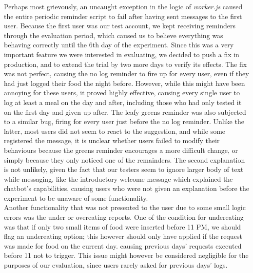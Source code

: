 Perhaps most grievously, an uncaught exception in the logic of \textit{worker.js} caused the entire periodic reminder script to fail after having sent messages to the first user. Because the first user was our test account, we kept receiving reminders through the evaluation period, which caused us to believe everything was behaving correctly until the 6th day of the experiment. Since this was a very important feature we were interested in evaluating, we decided to push a fix in production, and to extend the trial by two more days to verify its effects. The fix was not perfect, causing the no log reminder to fire up for every user, even if they had just logged their food the night before. However, while this might have been annoying for these users, it proved highly effective, causing every single user to log at least a meal on the day and after, including those who had only tested it on the first day and given up after. The leafy greens reminder was also subjected to a similar bug, firing for every user just before the no log reminder. Unlike the latter, most users did not seem to react to the suggestion, and while some registered the message, it is unclear whether users failed to modify their behaviours because the greens reminder encourages a more difficult change, or simply because they only noticed one of the remainders. The second explanation is not unlikely, given the fact that our testers seem to ignore larger body of text while messaging, like the introductory welcome message which explained the chatbot's capabilities, causing users who were not given an explanation before the experiment to be unaware of some functionality. \\
Another functionality that was not presented to the user due to some small logic errors was the under or overeating reports. One of the condition for undereating was that if only two small items of food were inserted before 11 PM, we should flag an undereating option; this however should only have applied if the request was made for food on the current day. causing previous days' requests executed before 11 not to trigger. This issue might however be considered negligible for the purposes of our evaluation, since users rarely asked for previous days' logs.
